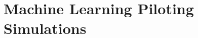 \documentclass{beamer}
\begin{document}
%
%
%

\section{Machine Learning Piloting Simulations} 
\end{document}
